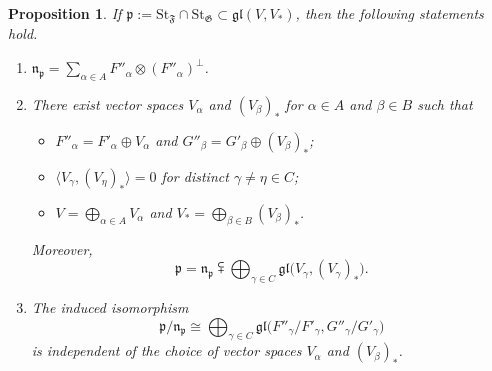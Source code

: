 \documentclass{article}
\newcommand {\St} {\mathrm{St}}
\def\gl{\mathfrak {gl}}
\def\n{\mathfrak {n}}
\def\p{\mathfrak {p}}
\def\F{\mathfrak{F}}
\def\G{\mathfrak{G}}
\newtheorem{prop}[thm]{Proposition}
\begin{document}
\begin{prop} \label{splitexact}
If $\p := \St_\F \cap \St_\G \subset \gl(V,V_*)$, then the following statements hold.
\begin{enumerate}
\item \label{firstitem} $\n_\p = \sum_{\alpha \in A} F''_\alpha \otimes (F''_\alpha)^\perp$.

\item \label{seconditem} There exist vector spaces $V_\alpha$ and $(V_\beta)_*$ for $\alpha \in A$ and $\beta \in B$ such that 
\begin{itemize}
\item $F''_\alpha = F'_\alpha \oplus V_\alpha$ and $G''_\beta = G'_\beta \oplus (V_\beta)_*$;
\item $\langle V_\gamma, (V_\eta)_* \rangle = 0$ for distinct $\gamma \neq \eta \in C$;
\item $V = \bigoplus_{\alpha \in A} V_\alpha$ and $V_* = \bigoplus_{\beta \in B} (V_\beta)_*$.
\end{itemize}
Moreover,
$$\p = \n_\p \subsetplus \bigoplus_{\gamma \in C} \gl \big( V_\gamma , (V_\gamma)_* \big).$$

\item \label{thirditem} The induced isomorphism $${\p} / {\n_\p} \cong \bigoplus_{\gamma \in C} \gl \big({F''_\gamma} / {F'_\gamma} , {G''_\gamma} / {G'_\gamma} \big)$$ is independent of the choice of vector spaces  $V_\alpha$ and $(V_\beta)_*$.

\end{enumerate}
\end{prop}
\end{document}
